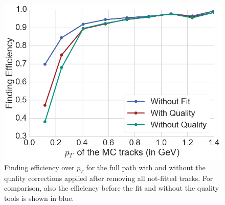 \begin{figure}
  \centering
  \includegraphics[width=0.7\linewidth]{figures/workflow/efficiency_after_fit.png}
  \caption{Finding efficiency over $p_T$ for the full path with and without the quality corrections applied after removing all not-fitted tracks. For comparison, also the efficiency before the fit and without the quality tools is shown in blue.}
  \label{fig-efficiency-after-fitting}
\end{figure}


